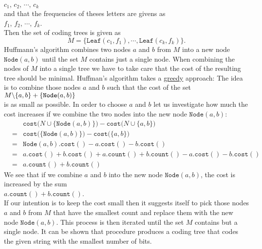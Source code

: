 \\[0.2cm]
\hspace*{1.3cm}
$c_1$, $c_2$, $\cdots$, $c_k$
\\[0.2cm]
and that the frequencies of theses letters are givens as
\\[0.2cm]
\hspace*{1.3cm}
$f_1$, $f_2$, $\cdots$, $f_k$.
\\[0.2cm]
Then the set of coding trees is given as
\begin{equation}
  \label{eq:huffmann1}
 M = \bigl\{  \mathtt{Leaf}(c_1, f_1), \cdots, \mathtt{Leaf}(c_k, f_k) \bigr\}.   
\end{equation}
Huffmann's algorithm combines two nodes $a$ and $b$ from $M$ into a new node
$\mathtt{Node}(a,b)$ until the set $M$ contains just a single node.  When combining the nodes of $M$ into a single
tree we have to take care that the cost of the resulting tree should be minimal.
Huffman's algorithm takes a \href{https://en.wikipedia.org/wiki/Greedy_algorithm}{greedy} approach: 
The idea is to combine those nodes $a$ and $b$ such that the cost of the set
\\[0.2cm]
\hspace*{1.3cm}
$M \symbol{92} \{a,b\} + \{ \mathtt{Node}(a,b) \}$
\\[0.2cm]
is as small as possible.
In order to choose $a$ and $b$ let us investigate how much the cost increases if we combine the two nodes
into the new node $\mathtt{Node}(a,b)$:
\begin{eqnarray*}
& & \mathtt{cost}\bigl(N \cup \{ \mathtt{Node}(a,b) \}\bigr) - \mathtt{cost}\bigl(N \cup \{ a,b \}\bigr) \\
&=& \mathtt{cost}\bigl( \{ \mathtt{Node}(a,b) \}\bigr) - \mathtt{cost}\bigl(\{ a,b \}\bigr)              \\
&=& \mathtt{Node}(a,b).\mathtt{cost}() - a.\mathtt{cost}() - b.\mathtt{cost}()                           \\
&=&   a.\mathtt{cost}() + b.\mathtt{cost}() + a.\mathtt{count}() + b.\mathtt{count}() 
    - a.\mathtt{cost}() - b.\mathtt{cost}()                                                              \\
&=& a.\mathtt{count}() + b.\mathtt{count}() 
\end{eqnarray*}
We see that if we combine $a$ and $b$ into the new node $\mathtt{Node}(a,b)$, the cost is increased by the sum 
\\[0.2cm]
\hspace*{1.3cm}
$a.\mathtt{count}() + b.\mathtt{count}()$. 
\\[0.2cm]
If our intention is to keep the cost small then it suggests itself to pick those nodes
$a$ and $b$ from $M$ that have the smallest count and replace them with the new node
$\mathtt{Node}(a,b)$.  This process is then iterated until the set $M$ contains but a single node.
It can be shown that procedure produces a coding tree that codes the given string with the smallest number of bits.

